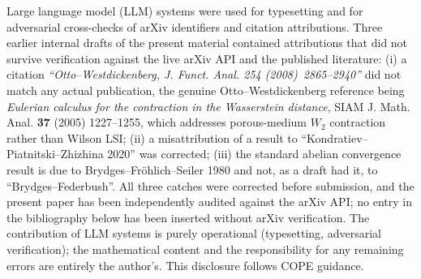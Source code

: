 \documentclass[11pt,reqno]{amsart}
\theoremstyle{plain}
\theoremstyle{definition}
\theoremstyle{remark}
\begin{document}
Large language model (LLM) systems were used for typesetting and for adversarial cross-checks of arXiv identifiers and citation attributions. Three earlier internal drafts of the present material contained attributions that did not survive verification against the live arXiv API and the published literature: (i) a citation \emph{``Otto--Westdickenberg, J. Funct. Anal. 254 (2008)~2865--2940''} did not match any actual publication, the genuine Otto--Westdickenberg reference being \emph{Eulerian calculus for the contraction in the Wasserstein distance}, SIAM J. Math. Anal. \textbf{37} (2005) 1227--1255, which addresses porous-medium $W_2$ contraction rather than Wilson LSI; (ii) a misattribution of a result to ``Kondratiev--Piatnitski--Zhizhina 2020'' was corrected; (iii) the standard abelian convergence result is due to Brydges--Fr\"ohlich--Seiler 1980 \cite{BFS80} and not, as a draft had it, to ``Brydges--Federbush''. All three catches were corrected before submission, and the present paper has been independently audited against the arXiv API; no entry in the bibliography below has been inserted without arXiv verification. The contribution of LLM systems is purely operational (typesetting, adversarial verification); the mathematical content and the responsibility for any remaining errors are entirely the author's. This disclosure follows COPE guidance.
\end{document}

